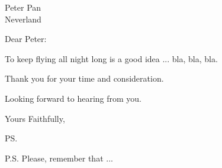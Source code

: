 \documentclass[12pt]{letter}
\begin{document}
\begin{letter}{Peter Pan\\Neverland} %

\opening{Dear Peter:}

To keep flying all night long is a good idea ... bla, bla, bla.

Thank you for your time and consideration.

Looking forward to hearing from you.

\closing{Yours Faithfully,}

\ps

P.S. Please, remember that ...


\end{letter}
\end{document}
